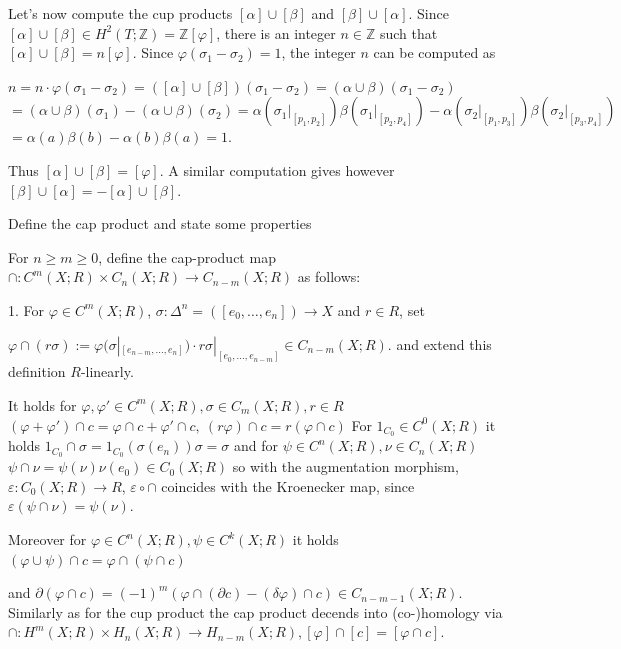 Let's now compute the cup products \([\alpha] \cup [\beta]\) and \([\beta] \cup [\alpha]\). Since \([\alpha] \cup [\beta] \in H^2(T; \mathbb{Z}) = \mathbb{Z}[\varphi]\), 
there is an integer \(n \in \mathbb{Z}\) such that \([\alpha] \cup [\beta] = n[\varphi]\). Since \(\varphi(\sigma_1 - \sigma_2) = 1\), the integer \(n\) can be computed as

\(n = n \cdot \varphi (\sigma_1 - \sigma_2) = ([\alpha] \cup [\beta]) (\sigma_1 - \sigma_2) = (\alpha \cup \beta) (\sigma_1 - \sigma_2)\)
\(= (\alpha \cup \beta) (\sigma_1) - (\alpha \cup \beta) (\sigma_2) = \alpha (\sigma_1|_{[p_1, p_2]}) \beta (\sigma_1|_{[p_2, p_4]}) - \alpha (\sigma_2|_{[p_1, p_3]}) \beta (\sigma_2|_{[p_3, p_4]})\)
\(= \alpha (a) \beta (b) - \alpha (b) \beta (a) = 1\).

Thus \([\alpha] \cup [\beta] = [\varphi]\). A similar computation gives however \([\beta] \cup [\alpha] = - [\alpha] \cup [\beta]\).


Define the cap product and state some properties

For \(n \geq m \geq 0\), define the cap-product map \(\cap : C^m(X; R) \times C_n(X; R) \to C_{n-m}(X; R)\) as follows:

1. For \(\varphi \in C^m(X; R)\), \(\sigma : \Delta^n = ([e_0, \dotsc, e_n]) \to X\) and \(r \in R\), set 

\(\varphi \cap (r\sigma) := \varphi(\sigma|_{[e_{n-m}, \dotsc, e_n]}) \cdot r \sigma|_{[e_0, \dotsc, e_{n-m}]} \in C_{n-m}(X; R).\)
and extend this definition \( R \)-linearly.

It holds for \( \varphi, \varphi' \in C^m(X;R), \sigma \in C_m(X;R), r \in R \)
\( (\varphi + \varphi') \cap c = \varphi \cap c + \varphi' \cap c, \ (r\varphi) \cap c = r(\varphi \cap c) \)
For \( 1_{C_0} \in C^0(X;R) \) it holds
\( 1_{C_0} \cap \sigma = 1_{C_0}(\sigma(e_n))\sigma = \sigma \)
and for \( \psi \in C^n(X;R), \nu \in C_n(X;R) \)
\( \psi \cap \nu = \psi(\nu)\nu(e_0) \in C_0(X;R) \)
so with the augmentation morphism, \( \varepsilon : C_0(X;R) \to R \), \( \varepsilon \circ \cap \) coincides with the Kroenecker map, since \( \varepsilon(\psi \cap \nu) = \psi(\nu) \).

Moreover for \( \varphi \in C^n(X;R), \psi \in C^k(X;R) \) it holds
\( (\varphi \cup \psi) \cap c = \varphi \cap (\psi \cap c) \)

and
\( \partial(\varphi \cap c) = (-1)^m(\varphi \cap (\partial c) -(\delta \varphi) \cap c ) \in C_{n-m-1}(X;R) \).
Similarly as for the cup product the cap product decends into (co-)homology via
\( \cap : H^m(X;R) \times H_n(X;R) \to H_{n-m}(X;R), [\varphi] \cap [c] = [\varphi \cap c] \).

